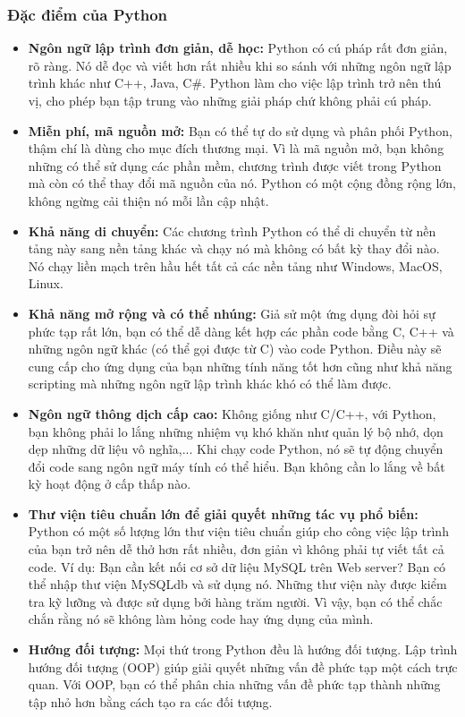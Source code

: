 \subsubsection{Đặc điểm của Python}
\begin{itemize}
    \item \textbf{Ngôn ngữ lập trình đơn giản, dễ học:} Python có cú pháp rất đơn giản, rõ ràng. Nó dễ đọc và viết hơn rất nhiều khi so sánh với những ngôn ngữ lập trình khác như C++, Java, C\#. Python làm cho việc lập trình trở nên thú vị, cho phép bạn tập trung vào những giải pháp chứ không phải cú pháp.
    \item \textbf{Miễn phí, mã nguồn mở:} Bạn có thể tự do sử dụng và phân phối Python, thậm chí là dùng cho mục đích thương mại. Vì là mã nguồn mở, bạn không những có thể sử dụng các phần mềm, chương trình được viết trong Python mà còn có thể thay đổi mã nguồn của nó. Python có một cộng đồng rộng lớn, không ngừng cải thiện nó mỗi lần cập nhật.
    \item \textbf{Khả năng di chuyển:} Các chương trình Python có thể di chuyển từ nền tảng này sang nền tảng khác và chạy nó mà không có bất kỳ thay đổi nào. Nó chạy liền mạch trên hầu hết tất cả các nền tảng như Windows, MacOS, Linux.
    \item \textbf{Khả năng mở rộng và có thể nhúng:} Giả sử một ứng dụng đòi hỏi sự phức tạp rất lớn, bạn có thể dễ dàng kết hợp các phần code bằng C, C++ và những ngôn ngữ khác (có thể gọi được từ C) vào code Python. Điều này sẽ cung cấp cho ứng dụng của bạn những tính năng tốt hơn cũng như khả năng scripting mà những ngôn ngữ lập trình khác khó có thể làm được.
    \item \textbf{Ngôn ngữ thông dịch cấp cao:} Không giống như C/C++, với Python, bạn không phải lo lắng những nhiệm vụ khó khăn như quản lý bộ nhớ, dọn dẹp những dữ liệu vô nghĩa,... Khi chạy code Python, nó sẽ tự động chuyển đổi code sang ngôn ngữ máy tính có thể hiểu. Bạn không cần lo lắng về bất kỳ hoạt động ở cấp thấp nào.
    \item \textbf{Thư viện tiêu chuẩn lớn để giải quyết những tác vụ phổ biến:} Python có một số lượng lớn thư viện tiêu chuẩn giúp cho công việc lập trình của bạn trở nên dễ thở hơn rất nhiều, đơn giản vì không phải tự viết tất cả code. Ví dụ: Bạn cần kết nối cơ sở dữ liệu MySQL trên Web server? Bạn có thể nhập thư viện MySQLdb và sử dụng nó. Những thư viện này được kiểm tra kỹ lưỡng và được sử dụng bởi hàng trăm người. Vì vậy, bạn có thể chắc chắn rằng nó sẽ không làm hỏng code hay ứng dụng của mình.
    \item \textbf{Hướng đối tượng:} Mọi thứ trong Python đều là hướng đối tượng. Lập trình hướng đối tượng (OOP) giúp giải quyết những vấn đề phức tạp một cách trực quan. Với OOP, bạn có thể phân chia những vấn đề phức tạp thành những tập nhỏ hơn bằng cách tạo ra các đối tượng.
\end{itemize}
